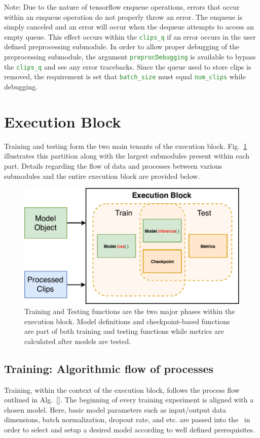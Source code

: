 \documentclass{llncs}
\begin{document}
Note: Due to the nature of tensorflow enqueue operations, errors that occur within an enqueue operation do not properly throw an error. 
The enqueue is simply canceled and an error will occur when the dequeue attempts to access an empty queue. 
This effect occurs within the \texttt{\textcolor{ForestGreen}{clips\_q}} if an error occurs in the user defined preprocessing submodule.
In order to allow proper debugging of the preprocessing submodule, the argument \texttt{\textcolor{ForestGreen}{preprocDebugging}} is available to bypass the \texttt{\textcolor{ForestGreen}{clips\_q}} and see any error tracebacks.
Since the queue used to store clips is removed, the requirement is set that \texttt{\textcolor{ForestGreen}{batch\_size}} must equal \texttt{\textcolor{ForestGreen}{num\_clips}} while debugging.


\section{Execution Block}
\label{sec:execblock}
Training and testing form the two main tenants of the execution block. 
Fig.~\ref{fig:exec_block} illustrates this partition along with the largest submodules present within each part.
Details regarding the flow of data and processes between various submodules and the entire execution block are provided below.

\begin{figure}[t!]
\centering
\includegraphics[width=0.8\columnwidth]{images/exec_block.pdf}
\caption{Training and Testing functions are the two major phases within the execution block. Model definitions and checkpoint-based functions are part of both training and testing functions while metrics are calculated after models are tested.}
\label{fig:exec_block}
\end{figure}

\subsection{Training: Algorithmic flow of processes}
\label{sec:training}
Training, within the context of the execution block, follows the process flow outlined in Alg.~\ref{}.
The beginning of every training experiment is aligned with a chosen model. 
Here, basic model parameters such as input/output data dimensions, batch normalization, dropout rate, and etc. are passed into the \model~in order to select and setup a desired model according to well defined prerequisites.
\end{document}
